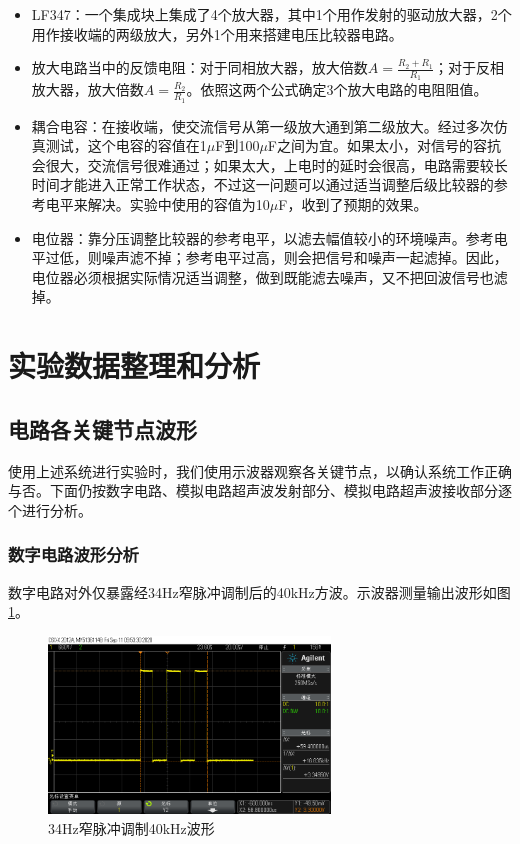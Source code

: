 \documentclass[a4paper, twocolumn]{ctexart}
\begin{document}
\begin{itemize}
    \item LF347：一个集成块上集成了4个放大器，其中1个用作发射的驱动放大器，2个用作接收端的两级放大，另外1个用来搭建电压比较器电路。

    \item 放大电路当中的反馈电阻：对于同相放大器，放大倍数$A=\frac{R_2+R_1}{R_1}$；对于反相放大器，放大倍数$A=\frac{R_2}{R_1}$。依照这两个公式确定3个放大电路的电阻阻值。

    \item 耦合电容：在接收端，使交流信号从第一级放大通到第二级放大。经过多次仿真测试，这个电容的容值在1$\mu$F到100$\mu$F之间为宜。如果太小，对信号的容抗会很大，交流信号很难通过；如果太大，上电时的延时会很高，电路需要较长时间才能进入正常工作状态，不过这一问题可以通过适当调整后级比较器的参考电平来解决。实验中使用的容值为10$\mu$F，收到了预期的效果。

    \item 电位器：靠分压调整比较器的参考电平，以滤去幅值较小的环境噪声。参考电平过低，则噪声滤不掉；参考电平过高，则会把信号和噪声一起滤掉。因此，电位器必须根据实际情况适当调整，做到既能滤去噪声，又不把回波信号也滤掉。

\end{itemize}

\section{实验数据整理和分析}

\subsection{电路各关键节点波形}

使用上述系统进行实验时，我们使用示波器观察各关键节点，以确认系统工作正确与否。下面仍按数字电路、模拟电路超声波发射部分、模拟电路超声波接收部分逐个进行分析。

\subsubsection{数字电路波形分析}

数字电路对外仅暴露经34Hz窄脉冲调制后的40kHz方波。示波器测量输出波形如图\ref{fig:clk_34_real}。

\begin{figure}[ht]
    \centering
    \includegraphics[width=7.5cm]{../assets/trans_2.png}
    \caption{34Hz窄脉冲调制40kHz波形}
    \label{fig:clk_34_real}
\end{figure}
\end{document}
